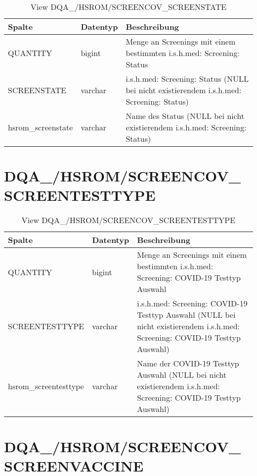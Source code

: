   \begin{table}[ht]
    \centering
    \caption{View DQA\_/HSROM/SCREENCOV\_SCREENSTATE}
    \label{tab:dqa/hsrom/screencovscreenstate}
    \begin{tabular}{||l|l|p{10cm}||}
      \hline
      Spalte & Datentyp & Beschreibung \\ [0.5ex] \hline \hline
      QUANTITY & bigint & Menge an Screenings mit einem bestimmten i.s.h.med: Screening: Status \\ \hline
      SCREENSTATE & varchar & i.s.h.med: Screening: Status (NULL bei nicht existierendem i.s.h.med: Screening: Status)\\ \hline
      hsrom\_screenstate & varchar & Name des Status (NULL bei nicht existierendem i.s.h.med: Screening: Status)\\ \hline
    \end{tabular}
  \end{table}
  \clearpage
  \section{DQA\_/HSROM/SCREENCOV\_\\ SCREENTESTTYPE}

  \begin{table}[ht]
    \centering
    \caption{View DQA\_/HSROM/SCREENCOV\_SCREENTESTTYPE}
    \label{tab:dqa/hsrom/screencovscreentesttype}
    \begin{tabular}{||l|l|p{10cm}||}
      \hline
      Spalte & Datentyp & Beschreibung \\ [0.5ex] \hline \hline
      QUANTITY & bigint & Menge an Screenings mit einem bestimmten i.s.h.med: Screening: COVID-19 Testtyp Auswahl \\ \hline
      SCREENTESTTYPE & varchar & i.s.h.med: Screening: COVID-19 Testtyp Auswahl (NULL bei nicht existierendem i.s.h.med: Screening: COVID-19 Testtyp Auswahl)\\ \hline
      hsrom\_screentesttype & varchar & Name der COVID-19 Testtyp Auswahl (NULL bei nicht existierendem i.s.h.med: Screening: COVID-19 Testtyp Auswahl)\\ \hline
    \end{tabular}
  \end{table}
 
  \section{DQA\_/HSROM/SCREENCOV\_\\ SCREENVACCINE}

